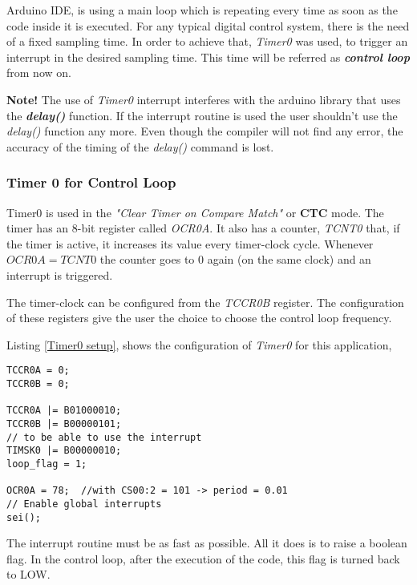 Arduino IDE, is using a main loop which is repeating every time as soon as the code inside it is executed. For any typical digital control system, there is the need of a fixed sampling time. In order to achieve that, \textit{Timer0} was used, to trigger an interrupt in the desired sampling time. This time will be referred as \textit{\textbf{control loop}} from now on.


\noindent \textbf{Note!} \quad	The use of \textit{Timer0} interrupt interferes with the arduino library that uses the \textit{\textbf{delay()}} function. If the interrupt routine is used the user shouldn't use the \textit{delay()} function any more. Even though the compiler will not find any error, the accuracy of the timing of the \textit{delay()} command is lost.

\subsubsection{Timer 0 for Control Loop} \label{sec:Control Loop}

Timer0 is used in the \textit{"Clear Timer on Compare Match"} or \textbf{CTC} mode. The timer has an 8-bit register called \textit{OCR0A}. It also has a counter, \textit{TCNT0} that, if the timer is active, it increases its value every timer-clock cycle. Whenever $OCR0A = TCNT0$ the counter goes to 0 again (on the same clock) and an interrupt is triggered.

The timer-clock can be configured from the \textit{TCCR0B} register. The configuration of these registers give the user the choice to choose the control loop frequency.

\noindent Listing \ref{Timer0 setup}, shows the configuration of \textit{Timer0} for this application,


\begin{lstlisting}[style=My_Arduino, label = Timer0 setup, caption = Setup of Timer0 registers]
TCCR0A = 0;
TCCR0B = 0;
  
TCCR0A |= B01000010;
TCCR0B |= B00000101;
// to be able to use the interrupt
TIMSK0 |= B00000010;
loop_flag = 1;
  
OCR0A = 78;  //with CS00:2 = 101 -> period = 0.01
// Enable global interrupts
sei();
\end{lstlisting}

\noindent The interrupt routine must be as fast as possible. All it does is to raise a boolean flag. In the control loop, after the execution of the code, this flag is turned back to LOW.


